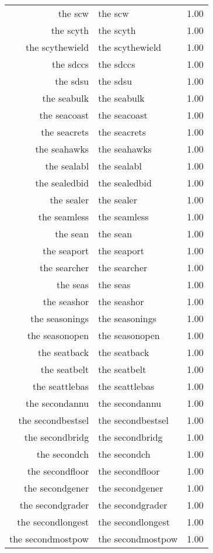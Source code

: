 \begin{table}[ht]
\begin{tabular}{rlr}
  the scw & the scw & 1.00 \\ 
  the scyth & the scyth & 1.00 \\ 
  the scythewield & the scythewield & 1.00 \\ 
  the sdccs & the sdccs & 1.00 \\ 
  the sdsu & the sdsu & 1.00 \\ 
  the seabulk & the seabulk & 1.00 \\ 
  the seacoast & the seacoast & 1.00 \\ 
  the seacrets & the seacrets & 1.00 \\ 
  the seahawks & the seahawks & 1.00 \\ 
  the sealabl & the sealabl & 1.00 \\ 
  the sealedbid & the sealedbid & 1.00 \\ 
  the sealer & the sealer & 1.00 \\ 
  the seamless & the seamless & 1.00 \\ 
  the sean & the sean & 1.00 \\ 
  the seaport & the seaport & 1.00 \\ 
  the searcher & the searcher & 1.00 \\ 
  the seas & the seas & 1.00 \\ 
  the seashor & the seashor & 1.00 \\ 
  the seasonings & the seasonings & 1.00 \\ 
  the seasonopen & the seasonopen & 1.00 \\ 
  the seatback & the seatback & 1.00 \\ 
  the seatbelt & the seatbelt & 1.00 \\ 
  the seattlebas & the seattlebas & 1.00 \\ 
  the secondannu & the secondannu & 1.00 \\ 
  the secondbestsel & the secondbestsel & 1.00 \\ 
  the secondbridg & the secondbridg & 1.00 \\ 
  the secondch & the secondch & 1.00 \\ 
  the secondfloor & the secondfloor & 1.00 \\ 
  the secondgener & the secondgener & 1.00 \\ 
  the secondgrader & the secondgrader & 1.00 \\ 
  the secondlongest & the secondlongest & 1.00 \\ 
  the secondmostpow & the secondmostpow & 1.00 \\ 

\end{tabular}
\end{table}
